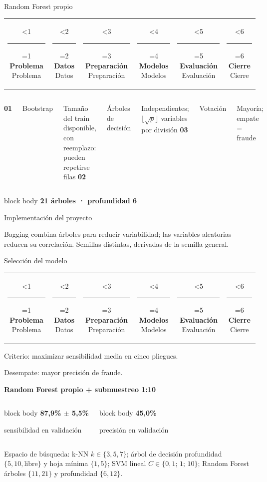\documentclass[aspectratio=169,10pt]{beamer}
\makeatletter
\newcommand{\metricbox}[2]{%
  \begin{beamercolorbox}[wd=\linewidth,sep=0.55em,center,rounded=true]{block body}%
    {\color{FraudBlue}\Large\bfseries #1}\par\vspace{0.12em}
    {\small #2}
  \end{beamercolorbox}%
}
\newcommand{\phasestep}[3]{%
  \begin{minipage}[t]{0.158\textwidth}\centering
    \ifnum#1<#2\color{FraudLine}\else\color{FraudBlue}\fi
    \rule{0.14\textwidth}{1.4pt}\par\vspace{0.04cm}
    \ifnum#1=#2
      {\color{FraudBlue}\bfseries\scriptsize #3}%
    \else
      {\color{FraudGray}\tiny #3}%
    \fi
  \end{minipage}%
}
\newcommand{\phasebar}[1]{%
  \vspace{0.03cm}
  \begin{center}
    \begin{tabular}{@{}c@{}c@{}c@{}c@{}c@{}c@{}}
      \phasestep{#1}{1}{Problema} &
      \phasestep{#1}{2}{Datos} &
      \phasestep{#1}{3}{Preparación} &
      \phasestep{#1}{4}{Modelos} &
      \phasestep{#1}{5}{Evaluación} &
      \phasestep{#1}{6}{Cierre}
    \end{tabular}
  \end{center}
  \vspace{0.12cm}
}
\makeatother
\begin{document}
\begin{frame}{Random Forest propio}
  \phasebar{4}
  \vfill
  \begin{columns}[c,onlytextwidth]
      {\color{FraudBlue}\Large\bfseries 01}\par\vspace{0.12cm}
      {\large Bootstrap}\par{\small\color{FraudGray}Tamaño del train disponible, con reemplazo: pueden repetirse filas}
    \centering{\Large\color{FraudLine}$\longrightarrow$}
      {\color{FraudBlue}\Large\bfseries 02}\par\vspace{0.12cm}
      {\large Árboles de decisión}\par{\small\color{FraudGray}Independientes; $\lfloor\sqrt{p}\rfloor$ variables por división}
    \centering{\Large\color{FraudLine}$\longrightarrow$}
      {\color{FraudBlue}\Large\bfseries 03}\par\vspace{0.12cm}
      {\large Votación}\par{\small\color{FraudGray}Mayoría; empate = fraude}
  \end{columns}
  \vspace{0.3cm}
  \metricbox{21 árboles · profundidad 6}{Implementación del proyecto}
  \vspace{0.18cm}
  {\small\color{FraudGray}Bagging combina árboles para reducir variabilidad; las variables aleatorias reducen su correlación. Semillas distintas, derivadas de la semilla general.}\par
  \vfill
\end{frame}

\begin{frame}{Selección del modelo}
  \phasebar{5}
  \vfill
  {\large Criterio: maximizar sensibilidad media en cinco pliegues.}\par
  {\normalsize\color{FraudGray}Desempate: mayor precisión de fraude.}\par
  \vspace{0.55cm}
  {\color{FraudBlue}\Large\bfseries Random Forest propio + submuestreo 1:10}\par
  \vspace{0.32cm}
  \begin{columns}[c,onlytextwidth]
    \metricbox{87,9\% $\pm$ 5,5\%}{sensibilidad en validación}
    \metricbox{45,0\%}{precisión en validación}
  \end{columns}
  \vspace{0.34cm}
  {\small\color{FraudGray}Espacio de búsqueda: k-NN $k\in\{3,5,7\}$; árbol de decisión profundidad $\{5,10,\text{libre}\}$ y hoja mínima $\{1,5\}$; SVM lineal $C\in\{0{,}1;\,1;\,10\}$; Random Forest árboles $\{11,21\}$ y profundidad $\{6,12\}$.\par}
  \vfill
\end{frame}
\end{document}
